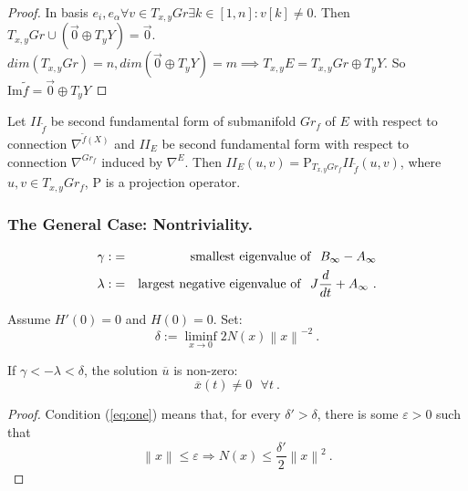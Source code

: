 \documentclass{llncs}
\newcommand{\CovariantDiffManif}[1]{\nabla^{#1}}
\begin{document}
\begin{proof}
In basis ${e_i, e_{\alpha}} \forall v \in T_{x, y}Gr \exists k\in [1, n]: v[k] \neq 0$. Then 
$T_{x, y}Gr \cup (\vec{0}\oplus T_yY) = \vec{0}$. $dim(T_{x, y}Gr)=n, dim(\vec{0}\oplus T_yY)=m 
\implies T_{x, y}E=T_{x, y}Gr \oplus T_yY$. 
So $\mathrm{Im}\tilde{f} = \vec{0}\oplus T_yY$
\end{proof}

\begin{lemma}
Let $II_\tilde{f}$ be second fundamental form of submanifold $Gr_f$ of $E$ with respect to connection $\CovariantDiffManif{\tilde{f}(X)}$ and $II_E$ be second fundamental form with respect to connection $\CovariantDiffManif{Gr_f}$ induced by $\CovariantDiffManif{E}$. Then $II_E(u, v) = \mathrm{P}_{T_{x, y}Gr_f} II_\tilde{f}(u, v)$, where $u, v \in T_{x, y}Gr_f$, $\mathrm{P}$ is a projection operator.
\end{lemma}
\begin{corollary}

\end{corollary}
%
\subsubsection{The General Case: Nontriviality.} %
\begin{eqnarray}
\gamma :&=&{\rm smallest\ eigenvalue\ of}\ \ B_{\infty} - A_{\infty} \\
   \lambda : &=& {\rm largest\ negative\ eigenvalue\ of}\ \
   J \frac{d}{dt} +A_{\infty}\ .
\end{eqnarray}

\begin{proposition}
Assume $H'(0)=0$ and $ H(0)=0$. Set:
\begin{equation}
   \delta := \liminf_{x\to 0} 2 N (x) \left\|x\right\|^{-2}\ .
   \label{eq:one}
\end{equation}

If $\gamma < - \lambda < \delta$,
the solution $\overline{u}$ is non-zero:
\begin{equation}
   \overline{x} (t) \ne 0\ \ \ \forall t\ .
\end{equation}
\end{proposition}
%
\begin{proof}
Condition (\ref{eq:one}) means that, for every $\delta ' > \delta$, there is some $\varepsilon > 0$ such that \begin{equation}
   \left\|x\right\| \le \varepsilon \Rightarrow N (x) \le
   \frac{\delta '}{2} \left\|x\right\|^{2}\ .
\end{equation}
\end{proof}
\end{document}
